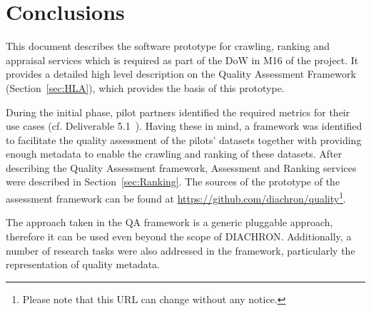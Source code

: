 
\section{Conclusions}
\label{sec:Conclusion} 

This document describes the software prototype for crawling, ranking and appraisal services which is required as part of the DoW in M16 of the project.
It provides a detailed high level description on the Quality Assessment Framework (Section~\ref{sec:HLA}), which provides the basis of this prototype.

During the initial phase, pilot partners identified the required metrics for their use cases (cf. Deliverable 5.1~\cite{diachron-d5.1}).
Having these in mind, a framework was identified to facilitate the quality assessment of the pilots' datasets together with providing enough metadata to enable the crawling and ranking of these datasets.
After describing the Quality Assessment framework, Assessment and Ranking services were described in Section~\ref{sec:Ranking}.
The sources of the prototype of the assessment framework can be found at \url{https://github.com/diachron/quality}\footnote{Please note that this URL can change without any notice.}.

The approach taken in the QA framework is a generic pluggable approach, therefore it can be used even beyond the scope of DIACHRON.
Additionally, a number of research tasks were also addressed in the framework, particularly the representation of quality metadata.